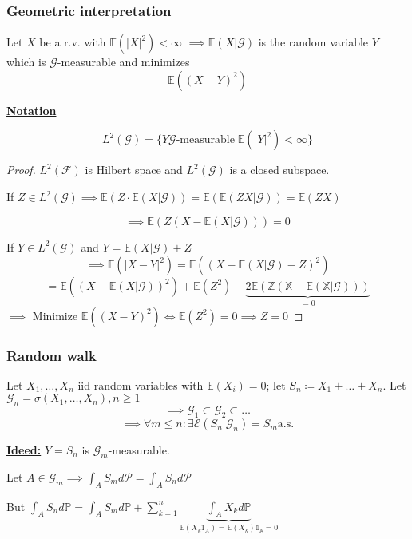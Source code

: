 \subsubsection{Geometric interpretation}

\begin{proposition}
    Let $X$ be a r.v. with $\mathbb{E}(|X|^2)<\infty$
    $\implies \mathbb{E}(X|\mathcal{G})$ is the random variable $Y$ which is $\mathcal{G}$-measurable and minimizes
    \[\mathbb{E}((X-Y)^2)\]
\end{proposition}

\underline{\textbf{Notation}}

\[L^2(\mathcal{G})=\{Y \mathcal{G}\text{-measurable}|\mathbb{E}(|Y|^2)<\infty\}\]


\begin{proof}
    $L^2(\mathcal{F})$ is Hilbert space and $L^2(\mathcal{G})$ is a closed subspace.

    If $Z\in L^2(\mathcal{G}) \implies \mathbb{E}(Z\cdot \mathbb{E}(X|\mathcal{G}))=\mathbb{E}(\mathbb{E}(ZX|\mathcal{G}))=\mathbb{E}(ZX)$

    \[\implies \mathbb{E}(Z(X-\mathbb{E}(X|\mathcal{G})))=0\]

    If $Y \in L^2(\mathcal{G})$ and $Y=\mathbb{E}(X|\mathcal{G})+Z$
    \[\implies \mathbb{E}(|X-Y|^2)=\mathbb{E}((X-\mathbb{E}(X|\mathcal{G})-Z)^2)\]
    \[=\mathbb{E}((X-\mathbb{E}(X|\mathcal{G}))^2)+\mathbb{E}(Z^2)-\underbrace{2\mathbb{E(Z(X-\mathbb{E}(X|\mathcal{G})))}}_{=0}\]
    $\implies$ Minimize $\mathbb{E}((X-Y)^2) \iff \mathbb{E}(Z^2)=0\implies Z=0$

\end{proof}

\subsubsection{Random walk}
Let $X_1,\dots,X_n$ iid random variables with $\mathbb{E}(X_i)=0$; let $S_n\coloneqq X_1+\dots+X_n$.
Let $\mathcal{G}_n=\sigma(X_1,\dots,X_n),n\geq 1$
\[\implies \mathcal{G}_1\subset \mathcal{G}_2\subset \dots\]
\[\implies \forall m\leq n: \exists\mathcal{E}(S_n|\mathcal{G}_n)=S_m \text{a.s.}\]

\underline{\textbf{Ideed:}} $Y=S_n$ is $\mathcal{G}_m$-measurable.

Let $A\in\mathcal{G}_m\implies \int_A S_m d\mathcal{P}=\int_A S_n d\mathcal{P}$

But $\int_A S_nd\mathbb{P}=\int_A S_m d\mathbb{P}+\sum_{k=1}^n \underbrace{\int_A X_k d\mathbb{P}}_{\mathbb{E}(X_k1_A)=\mathbb{E}(X_k)\mathbb{1_A}=0}$

